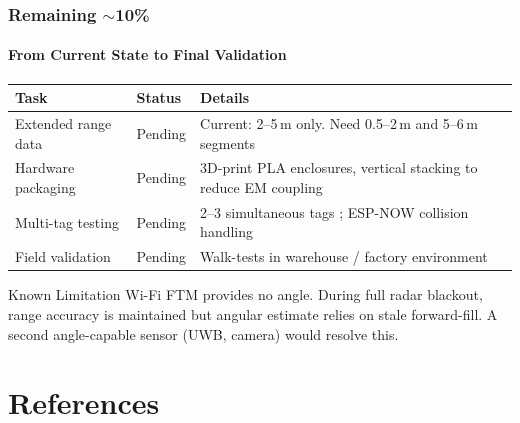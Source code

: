 \documentclass[
	11pt,
	aspectratio=169,
]{beamer}
\begin{document}
\begin{frame}
	\frametitle{Remaining $\sim$10\%}
	\framesubtitle{From Current State to Final Validation}

	\scriptsize
	\begin{table}
		\centering
		\begin{tabular}{l l p{5.5cm}}
			\toprule
			\textbf{Task} & \textbf{Status} & \textbf{Details} \\
			\midrule
			Extended range data & Pending & Current: 2--5\,m only. Need 0.5--2\,m and 5--6\,m segments \\[3pt]
			Hardware packaging & Pending & 3D-print PLA enclosures, vertical stacking to reduce EM coupling \\[3pt]
			Multi-tag testing & Pending & 2--3 simultaneous tags ; ESP-NOW collision handling \\[3pt]
			Field validation & Pending & Walk-tests in warehouse / factory environment \\
			\bottomrule
		\end{tabular}
	\end{table}

	\medskip

	\begin{alertblock}{Known Limitation}
		\scriptsize Wi-Fi FTM provides \alert{no angle}. During full radar blackout, range accuracy is maintained but angular estimate relies on stale forward-fill. A second angle-capable sensor (UWB, camera) would resolve this.
	\end{alertblock}
\end{frame}


\section{References}
\end{document}
